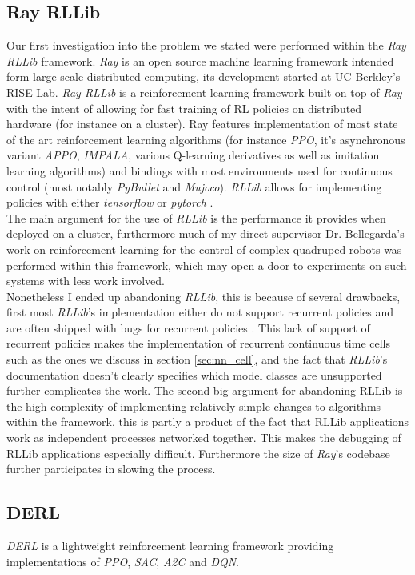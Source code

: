 \subsection{Ray RLLib}

Our first investigation into the problem we stated were performed within the \textit{Ray RLLib} framework. \textit{Ray} is an open source machine learning framework intended form large-scale distributed computing, its development started at UC Berkley's RISE Lab. \textit{Ray RLLib} \cite{rllib} is a reinforcement learning framework built on top of \textit{Ray} with the intent of allowing for fast training of RL policies on distributed hardware (for instance on a cluster). Ray features implementation of most state of the art reinforcement learning algorithms (for instance \textit{PPO}, it's asynchronous variant \textit{APPO}, \textit{IMPALA}, various Q-learning derivatives as well as imitation learning algorithms) and bindings with most environments used for continuous control (most notably \textit{PyBullet} and \textit{Mujoco}). \textit{RLLib} allows for implementing policies with either \textit{tensorflow} \cite{tensorflow2015-whitepaper} or \textit{pytorch} \cite{PytorchPaper}. \\

The main argument for the use of \textit{RLLib} is the performance it provides when deployed on a cluster, furthermore much of my direct supervisor Dr. Bellegarda's work on reinforcement learning for the control of complex quadruped robots was performed within this framework, which may open a door to experiments on such systems with less work involved. \\

Nonetheless I ended up abandoning \textit{RLLib}, this is because of several drawbacks, first most \textit{RLLib}'s implementation either do not support recurrent policies and are often shipped with bugs for recurrent policies \cite{RLLib_Bug}. This lack of support of recurrent policies makes the implementation of recurrent continuous time cells such as the ones we discuss in section \ref{sec:nn_cell}, and the fact that \textit{RLLib}'s documentation doesn't clearly specifies which model classes are unsupported further complicates the work. The second big argument for abandoning RLLib is the high complexity of implementing relatively simple changes to algorithms within the framework, this is partly a product of the fact that RLLib applications work as independent processes networked together. This makes the debugging of RLLib applications especially difficult. Furthermore the size of \textit{Ray}'s codebase further participates in slowing the process.

\subsection{DERL}

\textit{DERL} \cite{konobeev2018} is a lightweight reinforcement learning framework providing implementations of \textit{PPO}, \textit{SAC}, \textit{A2C} and \textit{DQN}.